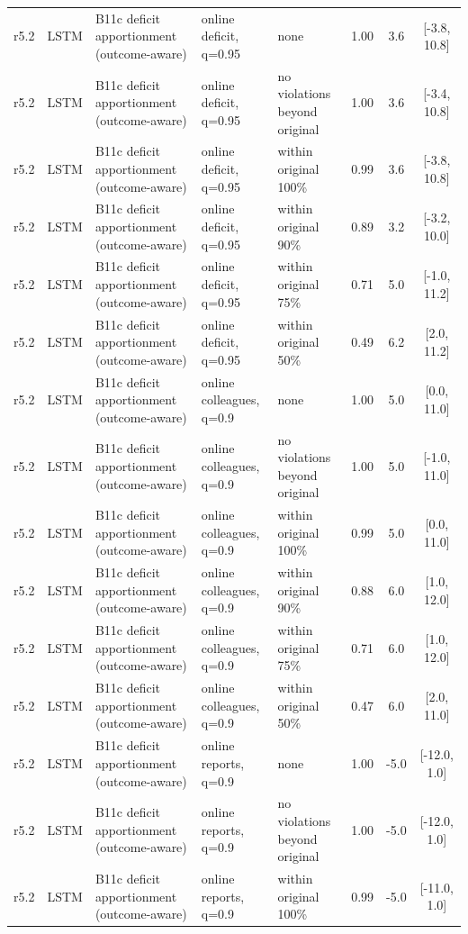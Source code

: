 \documentclass[10pt,onecolumn,letterpaper]{article}
\begin{document}
\begin{longtable}{lllp{4.2cm}p{3.4cm}ccc}
r5.2 & LSTM & B11c deficit apportionment (outcome-aware) & online deficit, q=0.95 & none & 1.00 & 3.6 & [-3.8, 10.8] \\
r5.2 & LSTM & B11c deficit apportionment (outcome-aware) & online deficit, q=0.95 & no violations beyond original & 1.00 & 3.6 & [-3.4, 10.8] \\
r5.2 & LSTM & B11c deficit apportionment (outcome-aware) & online deficit, q=0.95 & within original 100\% & 0.99 & 3.6 & [-3.8, 10.8] \\
r5.2 & LSTM & B11c deficit apportionment (outcome-aware) & online deficit, q=0.95 & within original 90\% & 0.89 & 3.2 & [-3.2, 10.0] \\
r5.2 & LSTM & B11c deficit apportionment (outcome-aware) & online deficit, q=0.95 & within original 75\% & 0.71 & 5.0 & [-1.0, 11.2] \\
r5.2 & LSTM & B11c deficit apportionment (outcome-aware) & online deficit, q=0.95 & within original 50\% & 0.49 & 6.2 & [2.0, 11.2] \\
r5.2 & LSTM & B11c deficit apportionment (outcome-aware) & online colleagues, q=0.9 & none & 1.00 & 5.0 & [0.0, 11.0] \\
r5.2 & LSTM & B11c deficit apportionment (outcome-aware) & online colleagues, q=0.9 & no violations beyond original & 1.00 & 5.0 & [-1.0, 11.0] \\
r5.2 & LSTM & B11c deficit apportionment (outcome-aware) & online colleagues, q=0.9 & within original 100\% & 0.99 & 5.0 & [0.0, 11.0] \\
r5.2 & LSTM & B11c deficit apportionment (outcome-aware) & online colleagues, q=0.9 & within original 90\% & 0.88 & 6.0 & [1.0, 12.0] \\
r5.2 & LSTM & B11c deficit apportionment (outcome-aware) & online colleagues, q=0.9 & within original 75\% & 0.71 & 6.0 & [1.0, 12.0] \\
r5.2 & LSTM & B11c deficit apportionment (outcome-aware) & online colleagues, q=0.9 & within original 50\% & 0.47 & 6.0 & [2.0, 11.0] \\
r5.2 & LSTM & B11c deficit apportionment (outcome-aware) & online reports, q=0.9 & none & 1.00 & -5.0 & [-12.0, 1.0] \\
r5.2 & LSTM & B11c deficit apportionment (outcome-aware) & online reports, q=0.9 & no violations beyond original & 1.00 & -5.0 & [-12.0, 1.0] \\
r5.2 & LSTM & B11c deficit apportionment (outcome-aware) & online reports, q=0.9 & within original 100\% & 0.99 & -5.0 & [-11.0, 1.0] \\

\end{longtable}
\end{document}
